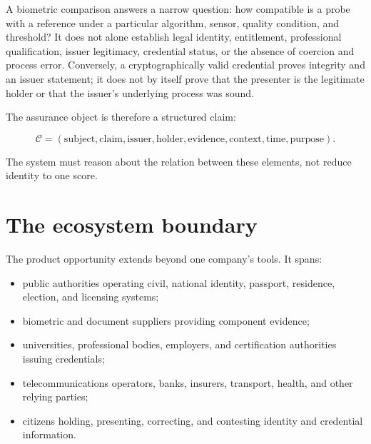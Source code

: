 A biometric comparison answers a narrow question: how compatible is a probe with a reference under a particular algorithm, sensor, quality condition, and threshold? It does not alone establish legal identity, entitlement, professional qualification, issuer legitimacy, credential status, or the absence of coercion and process error. Conversely, a cryptographically valid credential proves integrity and an issuer statement; it does not by itself prove that the presenter is the legitimate holder or that the issuer's underlying process was sound.

The assurance object is therefore a structured claim:

\begin{equation}
\mathcal{C}=(\text{subject},\text{claim},\text{issuer},\text{holder},\text{evidence},\text{context},\text{time},\text{purpose}).
\end{equation}

The system must reason about the relation between these elements, not reduce identity to one score.

\section{The ecosystem boundary}

The product opportunity extends beyond one company's tools. It spans:

\begin{itemize}
\item public authorities operating civil, national identity, passport, residence, election, and licensing systems;
\item biometric and document suppliers providing component evidence;
\item universities, professional bodies, employers, and certification authorities issuing credentials;
\item telecommunications operators, banks, insurers, transport, health, and other relying parties;
\item citizens holding, presenting, correcting, and contesting identity and credential information.
\end{itemize}

